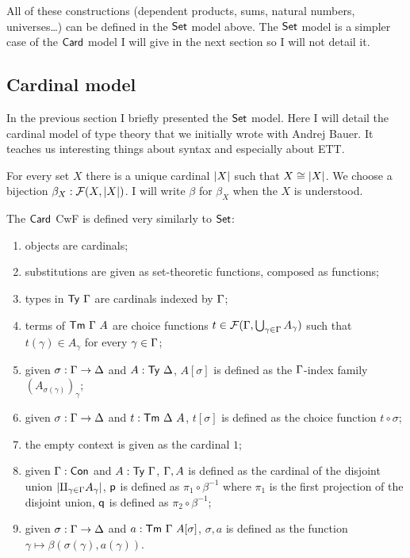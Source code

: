 All of these constructions (dependent products, sums, natural numbers,
universes\dots) can be defined in the \(\mathsf{Set}\) model above. The \(\mathsf{Set}\) model
is a simpler case of the \(\mathsf{Card}\) model I will give in the next section so I
will not detail it.

\subsection{Cardinal model}

In the previous section I briefly presented the \(\mathsf{Set}\) model. Here I will
detail the cardinal model of type theory that we initially wrote with Andrej
Bauer. It teaches us interesting things about syntax and especially about
\acrshort{ETT}.

For every set \(X\) there is a unique cardinal \(\left|X\right|\) such that
\(X \cong \left|X\right|\). We choose a bijection \(\beta_X : \mathcal{F}(X,\left|X\right|)\).
I will write \(\beta\) for \(\beta_X\) when the \(X\) is understood.

The \(\mathsf{Card}\) \acrshort{CwF} is defined very similarly to \(\mathsf{Set}\):
\begin{enumerate}
  \item objects are cardinals;
  \item substitutions are given as set-theoretic functions, composed as
  functions;
  \item types in \(\mathsf{Ty}\ \Gamma\) are cardinals indexed by \(\Gamma\);
  \item terms of \(\mathsf{Tm}\ \Gamma\ A\) are choice functions
  \(t \in \mathcal{F}(\Gamma,\bigcup_{\gamma \in \Gamma} A_\gamma)\) such that
  \(t(\gamma) \in A_\gamma\) for every \(\gamma \in \Gamma\);
  \item given \(\sigma : \Gamma \to \Delta\) and \(A : \mathsf{Ty}\ \Delta\), \(A[\sigma]\)
  is defined as the \(\Gamma\)-index family \((A_{\sigma(\gamma)})_\gamma\);
  \item given \(\sigma : \Gamma \to \Delta\) and \(t : \mathsf{Tm}\ \Delta\ A\), \(t[\sigma]\)
  is defined as the choice function \(t \circ \sigma\);
  \item the empty context is given as the cardinal \(1\);
  \item given \(\Gamma : \mathsf{Con}\) and \(A : \mathsf{Ty}\ \Gamma\), \(\Gamma, A\) is defined as
  the cardinal of the disjoint union
  \(\left|\amalg_{\gamma \in \Gamma} A_\gamma\right|\), \(\mathsf{p}\) is defined as
  \(\pi_1 \circ \beta^{-1}\) where \(\pi_1\) is the first projection of the
  disjoint union, \(\mathsf{q}\) is defined as \(\pi_2 \circ \beta^{-1}\);
  \item given \(\sigma : \Gamma \to \Delta\) and \(a : \mathsf{Tm}\ \Gamma\ A[\sigma]\),
  \(\sigma, a\) is defined as the function
  \(\gamma \mapsto \beta(\sigma(\gamma), a(\gamma))\).
\end{enumerate}

